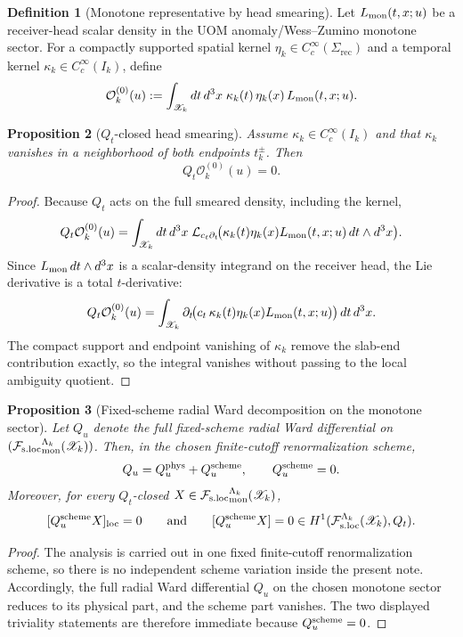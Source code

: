 \documentclass[11pt]{article}
\theoremstyle{definition}
\newtheorem{definition}{Definition}[section]
\theoremstyle{plain}
\newtheorem{proposition}[definition]{Proposition}
\theoremstyle{remark}
\newcommand{\Fsloc}{\mathcal F_{\rm s.loc}}
\newcommand{\Xscr}{\mathscr X}
\newcommand{\Islab}{I_k}
\newcommand{\Ozero}{\mathcal O^{(0)}}
\newcommand{\Qt}{Q_t}
\newcommand{\Qu}{Q_u}
\newcommand{\Quphys}{Q_u^{\rm phys}}
\newcommand{\Quscheme}{Q_u^{\rm scheme}}
\newcommand{\loc}{\mathrm{loc}}
\newcommand{\rec}{\mathrm{rec}}
\newcommand{\Lie}{\mathcal L}
\begin{document}
\begin{definition}[Monotone representative by head smearing]
\label{def:uomdesc-o0}
Let \(L_{\rm mon}(t,x;u)\) be a receiver-head scalar density in the UOM anomaly/Wess--Zumino
monotone sector.
For a compactly supported spatial kernel \(\eta_k\in C_c^\infty(\Sigma_{\rec})\) and a temporal
kernel \(\kappa_k\in C_c^\infty(\Islab)\), define
\begin{equation}
\Ozero_k(u)
:=
\int_{\Xscr_k} dt\,d^3x\;
\kappa_k(t)\,\eta_k(x)\,L_{\rm mon}(t,x;u).
\label{eq:uomdesc-o0-def}
\end{equation}
\end{definition}

\begin{proposition}[\(\Qt\)-closed head smearing]
\label{prop:uomdesc-qt-closed}
Assume \(\kappa_k\in C_c^\infty(\Islab)\) and that \(\kappa_k\) vanishes in a neighborhood of both
endpoints \(t_k^\pm\).
Then
\[
\Qt \Ozero_k(u)=0.
\]
\end{proposition}

\begin{proof}
Because \(\Qt\) acts on the full smeared density, including the kernel,
\[
\Qt \Ozero_k(u)
=
\int_{\Xscr_k} dt\,d^3x\;
\Lie_{c_t\partial_t}\!\big(\kappa_k(t)\eta_k(x)L_{\rm mon}(t,x;u)\,dt\wedge d^3x\big).
\]
Since \(L_{\rm mon}\,dt\wedge d^3x\) is a scalar-density integrand on the receiver head, the Lie
derivative is a total \(t\)-derivative:
\[
\Qt \Ozero_k(u)
=
\int_{\Xscr_k}\partial_t\!\big(c_t\,\kappa_k(t)\eta_k(x)L_{\rm mon}(t,x;u)\big)\,dt\,d^3x.
\]
The compact support and endpoint vanishing of \(\kappa_k\) remove the slab-end contribution exactly,
so the integral vanishes without passing to the local ambiguity quotient.
\end{proof}

\begin{proposition}[Fixed-scheme radial Ward decomposition on the monotone sector]
\label{prop:uomdesc-radial-decomp}
Let \(\Qu\) denote the full fixed-scheme radial Ward differential on
\(({\Fsloc}_{\rm mon}^{\Lambda_k}(\Xscr_k))\).
Then, in the chosen finite-cutoff renormalization scheme,
\[
\Qu=\Quphys+\Quscheme,
\qquad
\Quscheme=0.
\]
Moreover, for every \(\Qt\)-closed \(X\in{\Fsloc}_{\rm mon}^{\Lambda_k}(\Xscr_k)\),
\[
[\Quscheme X]_{\loc}=0
\qquad\text{and}\qquad
[\Quscheme X]=0\in H^1(\Fsloc^{\Lambda_k}(\Xscr_k),\Qt).
\]
\end{proposition}

\begin{proof}
The analysis is carried out in one fixed finite-cutoff renormalization scheme, so there is no
independent scheme variation inside the present note.
Accordingly, the full radial Ward differential \(\Qu\) on the chosen monotone sector reduces to its
physical part, and the scheme part vanishes.
The two displayed triviality statements are therefore immediate because \(\Quscheme=0\).
\end{proof}
\end{document}
